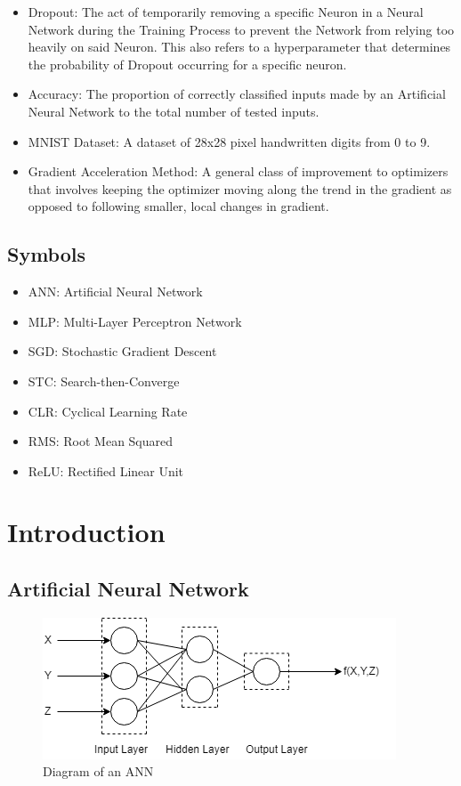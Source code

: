 \documentclass{article}
\begin{document}
\begin{itemize}
	\item Dropout: The act of temporarily removing a specific Neuron in a Neural Network during the Training Process to prevent the Network from relying too heavily on said Neuron. This also refers to a hyperparameter that determines the probability of Dropout occurring for a specific neuron. 
	\item Accuracy: The proportion of correctly classified inputs made by an Artificial Neural Network to the total number of tested inputs.
	\item MNIST Dataset: A dataset of 28x28 pixel handwritten digits from 0 to 9.
	\item Gradient Acceleration Method: A general class of improvement to optimizers that involves keeping the optimizer moving along the trend in the gradient as opposed to following smaller, local changes in gradient.
\end{itemize}
\subsection*{Symbols}
\begin{itemize}
	\item ANN: Artificial Neural Network
	\item MLP: Multi-Layer Perceptron Network
	\item SGD: Stochastic Gradient Descent
	\item STC: Search-then-Converge
	\item CLR: Cyclical Learning Rate
	\item RMS: Root Mean Squared
	\item ReLU: Rectified Linear Unit
\end{itemize}
	
\newpage
\listoffigures
\listoftables

\newpage
{}
\section{Introduction}
\subsection{Artificial Neural Network} 
\begin{figure}[h]
	
	\includegraphics[width=\textwidth,keepaspectratio]{ANN_Diagram.png}
	\setlength{\belowcaptionskip}{0.0pt}
	\caption{Diagram of an ANN}
	\setlength{\belowcaptionskip}{-15.0pt}
\end{figure}
\end{document}

